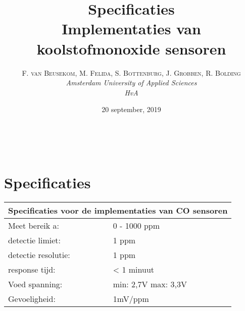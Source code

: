 \documentclass[a4paper, 11pt]{article} %
\title{\textbf{Specificaties}\\ %
Implementaties van koolstofmonoxide sensoren} %
\author{\textsc{F. van Beusekom, M. Felida, S. Bottenburg, J. Grobben, R. Bolding} %
\\{\textit{Amsterdam University of Applied Sciences\\ 
HvA}}} %
\date{20 september, 2019} %
\makeatletter
\renewcommand{\maketitle}{ %
\begin{flushright} %
{\LARGE\@title} %

\vspace{50pt} %

{\large\@author} %
\\\@date %

\vspace{40pt} %
\end{flushright}
}
\makeatother
\begin{document}
\captionsetup{justification=centering}
\hypersetup{hidelinks=true}
\maketitle %




\vspace{10pt} %

\newpage
\section{Specificaties}
\begin{center}
	\begin{tabular}{ | m{5cm} | m{5cm}| } 
		\hline
		\multicolumn{2}{|c|}{Specificaties voor de implementaties van CO sensoren} \\
		\hline
		Meet bereik a: & 0 - 1000 ppm \\
		\hline
		detectie limiet:  & 1 ppm
		\\ 
		\hline
		detectie resolutie: & 1 ppm 
		\\ 
		\hline
		response tijd: & < 1 minuut
		\\ 
		\hline
		Voed spanning: & min: 2,7V max: 3,3V
		\\ 
		\hline
		Gevoeligheid: & 1mV/ppm
		\\
		\hline
	\end{tabular}
\end{center}
\end{document}
